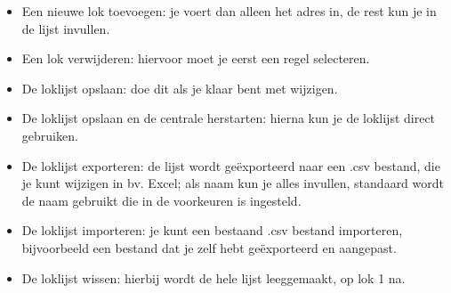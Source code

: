 \documentclass[12pt,a4paper]{report}
\begin{document}
\begin{itemize}
\item Een nieuwe lok toevoegen: je voert dan alleen het adres in, de rest kun je in de lijst invullen.
\item Een lok verwijderen: hiervoor moet je eerst een regel selecteren.
\item De loklijst opslaan: doe dit als je klaar bent met wijzigen.
\item De loklijst opslaan en de centrale herstarten: hierna kun je de loklijst direct gebruiken.
\item De loklijst exporteren: de lijst wordt ge\"{e}xporteerd naar een .csv bestand, die je kunt wijzigen in bv. Excel; als naam kun je alles invullen, standaard wordt de naam gebruikt die in de voorkeuren is ingesteld.
\item De loklijst importeren: je kunt een bestaand .csv bestand importeren, bijvoorbeeld een bestand dat je zelf hebt ge\"{e}xporteerd en aangepast.
\item De loklijst wissen: hierbij wordt de hele lijst leeggemaakt, op lok 1 na.
\end{itemize}
\end{document}
